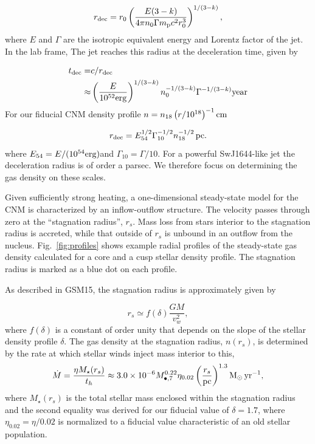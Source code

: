 \documentclass[usenatbib,fleqn]{mnras}
\newcommand{\Mbh}[1][]{M_{\bullet#1}}
\newcommand{\Msun}{{\rm M_\odot}}
\newcommand{\rs}{r_s}
\begin{document}
\begin{equation}
  r_{\rm dec} = r_0 \left( \frac{E(3-k)}{4\pi n_{0}
      \Gamma m_{\rm p} c^2 r_0^3} \right)^{1/(3-k)}, 
  \label{eq:rdec}
\end{equation}
%
where $E$ and $\Gamma$ are the isotropic equivalent energy and Lorentz
factor of the jet. In the lab frame, The jet reaches this radius
at the deceleration time, given by  

\begin{align}
 t_{\rm dec}= &c/r_{\rm dec} \nonumber\\
 \approx & \left(\frac{E}{10^{52} {\rm erg}}\right)^{1/(3-k)}
 n_0^{-1/(3-k)} \Gamma^{-1/(3-k)}{\rm year}
 \label{eq:tdec}
\end{align}
%
For our fiducial CNM density profile
$n=n_{18}\left(r/10^{18}\right)^{-1} {\rm cm}$

\begin{equation}
r_{\rm dec} = E_{54}^{1/2} \Gamma_{10}^{-1/2} n_{\rm 18}^{-1/2}\,{\rm pc}. 
\end{equation}
%
where $E_{54}=E/(10^{54} {\rm  erg})$and $\Gamma_{10}=\Gamma/10$.  For
a  powerful SwJ1644-like  jet the  deceleration radius  is of  order a
parsec. We  therefore focus  on determining the  gas density on these
scales.

Given sufficiently strong heating, a one-dimensional steady-state
model for the CNM is characterized by an inflow-outflow structure.
The velocity passes through zero at the ``stagnation radius'', $\rs$.
Mass loss from stars interior to the stagnation radius is accreted,
while that outside of $\rs$ is unbound in an outflow from the nucleus.
Fig.~\ref{fig:profiles} shows example radial profiles of the
steady-state gas density calculated for a core and a cusp stellar
density profile. The stagnation radius is marked as a blue dot on each
profile.



As described in GSM15, the stagnation radius is approximately given by

\begin{equation}
r_s \simeq f(\delta) \frac{G M}{v_w^2},
\label{eq:rs}
\end{equation}
%
where $f(\delta)$ is a constant of order unity that depends on the
slope of the stellar density profile $\delta$.  The gas density at the
stagnation radius, $n(\rs)$, is determined by the rate at which
stellar winds inject mass interior to this,
\begin{equation}
  \dot{M}=\frac{\eta M_{\rm \star}(\rs)}{t_h} \approx  3.0 \times 10^{-6} \Mbh[,7]^{0.22} \eta_{0.02} \left(\frac{r_s}{\rm
      pc}\right)^{1.3} \Msun \, {\rm yr}^{-1},
\label{eq:dotM}
\end{equation}
where $M_{\star}(\rs)$ is the total stellar mass enclosed within the
stagnation radius and the second equality was derived for our fiducial
value of $\delta=1.7$, where $\eta_{0.02}=\eta/0.02$ is normalized to
a fiducial value characteristic of an old stellar population.
\end{document}
